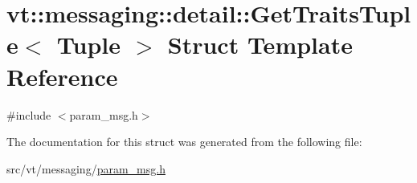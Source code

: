 \hypertarget{structvt_1_1messaging_1_1detail_1_1_get_traits_tuple}{}\section{vt\+:\+:messaging\+:\+:detail\+:\+:Get\+Traits\+Tuple$<$ Tuple $>$ Struct Template Reference}
\label{structvt_1_1messaging_1_1detail_1_1_get_traits_tuple}


{\ttfamily \#include $<$param\+\_\+msg.\+h$>$}



The documentation for this struct was generated from the following file\+:\begin{DoxyCompactItemize}
\item 
src/vt/messaging/\hyperlink{param__msg_8h}{param\+\_\+msg.\+h}\end{DoxyCompactItemize}
